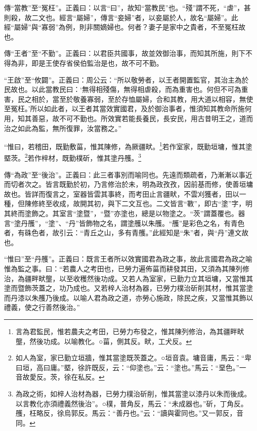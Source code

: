{\noindent\zhuan{}\fzbyks 傳“當教”至“冤枉”。正義曰：以言“曰”，故知“當教民”也。“殘”謂不死，“虐”，甚則殺，故二文也。經言“屬婦”，傳言“妾婦”者，以妾屬於人，故名“屬婦”。此經“屬婦”與“寡弱”為例，則非關嫡婦也。何者？妻子是家中之貴者，不至冤枉故也。 \par}

{\noindent\zhuan{}\fzbyks 傳“王者”至“不勤”。正義曰：以君臣共國事，故並效御治事，而知其所施，則下不得為非，即是王使存省侯伯監治是也，故不可不勤。 \par}

{\noindent\shu{}\fzkt “王啟”至“攸闢”。正義曰：周公云：“所以敬勞者，以王者開置監官，其治主為於民故也。以此當教民曰：‘無得相殘傷，無得相虐殺，而為重害也。何但不可為重害，民之相於，當至於敬養寡弱，至於存恤屬婦，合和其教，用大道以相容，無使至冤枉。’所以如此者，以王者其當效實國君，及於御治事者，惟須知其教命所施何用，知其善惡，故不可不勤也。所效實若能長養民，長安民，用古昔明王之，道而治之如此為監，無所復罪，汝當務之。” \par}

“惟曰，若稽田，既勤敷菑，惟其陳修，為厥疆畎。\footnote{言為君監民，惟若農夫之考田，已勞力布發之，惟其陳列修治，為其疆畔畎壟，然後功成。以喻教化。○菑，側其反。畎，工犬反。}若作室家，既勤垣墉，惟其塗塈茨。\footnote{如人為室，家已勤立垣牆，惟其當塗既茨蓋之。○垣音袁。墉音庸，馬云：“卑曰垣，高曰庸。”塈，徐許既反，云：“仰塗也。”云：“塗也。”馬云：“堊色。”一音故愛反。茨，徐在私反。}若作梓材，既勤樸斫，惟其塗丹雘。\footnote{為政之術，如梓人治材為器，已勞力樸治斫削，惟其當塗以漆丹以朱而後成。以言教化亦須禮義然後治”。○樸，普角反，馬云：“未成器也。”斫，丁角反。雘，枉略反，徐烏郭反。馬云：“善丹也。”云：“讀與霍同也。”又一郭反，音同。}


{\noindent\zhuan{}\fzbyks 傳“為政”至“後治”。正義曰：此三者事別而喻同也。先遠而類疏者，乃漸漸以事近而切者次之。皆言既勤於初，乃言修治於未，明為政孜孜，因前基而修，使善垣墉故也。皆詳而復言之，室器皆雲其事終，而考田止言疆畎，不雲刈獲者，田以一種，但陳修終至收成，故開其初，與下二文互也。二文皆言“斁”，即古“塗”字，明其終而塗飾之。其室言“塗暨”，“暨”亦塗也，總是以物塗之。“茨”謂蓋覆也。器言“塗丹雘”，“塗”、“丹”皆飾物之名，謂塗雘以朱雘。“雘”是彩色之名，有青色者，有硃色者，故引云：“青丘之山，多有青雘。”此經知是“朱”者，與“丹”連文故也。 \par}

{\noindent\shu{}\fzkt “惟曰”至“丹雘”。正義曰：既言王者所以效實國君為政之事，故此言國君為政之喻惟為監之事。曰：“若農人之考田也，已勞力遍佈菑而耕發其田，又須為其陳列修治，為疆畔畎壟，以至收穫然後功成。又若人為室家，已勤力立其垣墉，又當惟其塗而暨飾茨蓋之，功乃成也。又若梓人治材為器，已勞力樸治斫削其材，惟其當塗而丹漆以朱雘乃後成。以喻人君為政之道，亦勞心施政，除民之疾，又當惟其飾以禮義，使之行善然後治。” \par}

